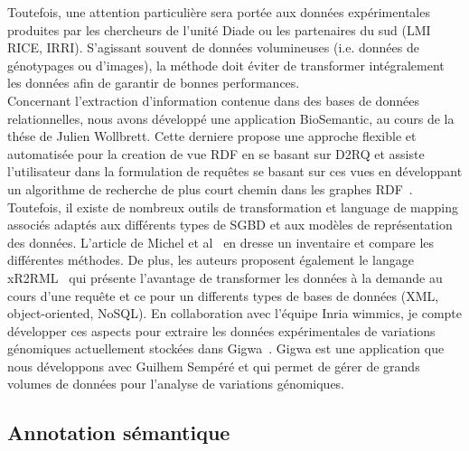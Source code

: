 Toutefois, une attention particulière sera portée aux données expérimentales produites par les chercheurs de l’unité Diade ou les partenaires du sud (LMI RICE, IRRI). S’agissant souvent de données volumineuses (i.e. données de génotypages ou d’images), la méthode doit éviter de transformer intégralement les données afin de garantir de bonnes performances.\\

Concernant l'extraction d'information contenue dans des bases de données relationnelles, nous avons développé une application BioSemantic, au cours de la thése de Julien Wollbrett. Cette derniere propose une approche flexible et automatisée pour la creation de vue RDF en se basant sur D2RQ  et assiste l'utilisateur dans la formulation de requêtes se basant sur ces vues en développant un algorithme de recherche de plus court chemin dans les graphes RDF~\cite{wollbrett2013clever}. Toutefois, il existe de nombreux outils de transformation et language de mapping associés adaptés aux différents types de SGBD et aux modèles de représentation des données. L'article de Michel et al~\cite{Antipolis2014} en dresse un inventaire et compare les différentes méthodes. De plus, les auteurs proposent également  le langage xR2RML~\cite{Michel2015} qui présente l’avantage de transformer les données à la demande au cours d’une requête et ce pour un differents types de bases de données (XML, object-oriented, NoSQL). En collaboration avec l’équipe Inria wimmics, je compte développer ces aspects pour extraire les données expérimentales de variations génomiques actuellement stockées dans Gigwa~\cite{Sempere2016}. Gigwa est une application que nous développons avec Guilhem Sempéré et qui permet de gérer de grands volumes de données pour l’analyse de variations génomiques.


\subsection{Annotation sémantique}

